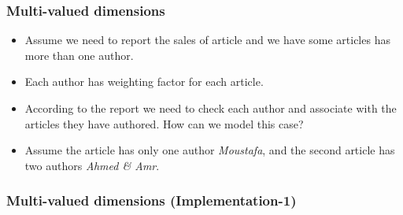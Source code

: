 \begin{frame}
	\frametitle{Multi-valued dimensions}
	\begin{example}
		\begin{itemize}[<+->]
			\item Assume we need to report the sales of article and we have some articles has more than one author.
			\item Each author has weighting factor for each article.
			\item According to the report we need to check each author and associate with the articles they have authored. How can we model this case?
			\item Assume the article has only one author \textit{Moustafa}, and the second article has two authors \textit{Ahmed \& Amr}.
		\end{itemize}
	\end{example}

\begin{table}
	\caption{author and articles sample data.}
\end{table}

\end{frame}
\begin{frame}
\frametitle{Multi-valued dimensions (Implementation-1)}



\end{frame}
